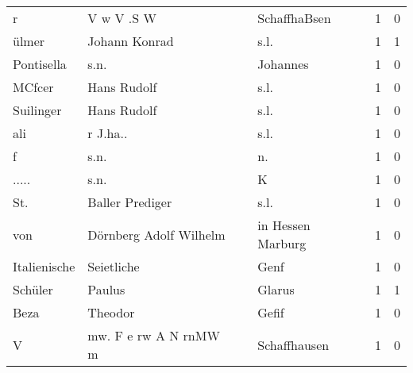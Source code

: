 \begin{tabular}{llllrr}
                        r &                         V w V .S W &             &                                SchaffhaBsen &          1 &         0 \\
                    ülmer &                      Johann Konrad &             &                                        s.l. &          1 &         1 \\
               Pontisella &                               s.n. &             &                                    Johannes &          1 &         0 \\
                   MCfcer &                        Hans Rudolf &             &                                        s.l. &          1 &         0 \\
                Suilinger &                        Hans Rudolf &             &                                        s.l. &          1 &         0 \\
                      ali &                           r J.ha.. &             &                                        s.l. &          1 &         0 \\
                        f &                               s.n. &             &                                         n.  &          1 &         0 \\
                    ..... &                               s.n. &             &                                           K &          1 &         0 \\
                      St. &                    Baller Prediger &             &                                        s.l. &          1 &         0 \\
                      von &             Dörnberg Adolf Wilhelm &             &                           in Hessen Marburg &          1 &         0 \\
             Italienische &                         Seietliche &             &                                        Genf &          1 &         0 \\
                  Schüler &                             Paulus &             &                                      Glarus &          1 &         1 \\
                     Beza &                            Theodor &             &                                       Gefif &          1 &         0 \\
                        V &              mw. F e rw A N rnMW m &             &                                Schaffhausen &          1 &         0 \\

\end{tabular}
